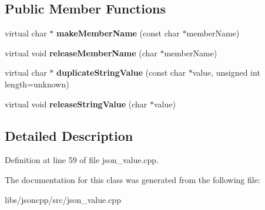 \subsection*{Public Member Functions}
\begin{DoxyCompactItemize}
\item 
\hypertarget{class_json_1_1_default_value_allocator_a83643548a23763cd9e8fcc9889ae3428}{virtual char $\ast$ {\bfseries make\-Member\-Name} (const char $\ast$member\-Name)}\label{class_json_1_1_default_value_allocator_a83643548a23763cd9e8fcc9889ae3428}

\item 
\hypertarget{class_json_1_1_default_value_allocator_a62df0985d957573f82be4f520bf00043}{virtual void {\bfseries release\-Member\-Name} (char $\ast$member\-Name)}\label{class_json_1_1_default_value_allocator_a62df0985d957573f82be4f520bf00043}

\item 
\hypertarget{class_json_1_1_default_value_allocator_adc2dc8da259fe1153594787cfcfc68d5}{virtual char $\ast$ {\bfseries duplicate\-String\-Value} (const char $\ast$value, unsigned int length=unknown)}\label{class_json_1_1_default_value_allocator_adc2dc8da259fe1153594787cfcfc68d5}

\item 
\hypertarget{class_json_1_1_default_value_allocator_a5e7f4fbebe7f9263090276e937a6a8d2}{virtual void {\bfseries release\-String\-Value} (char $\ast$value)}\label{class_json_1_1_default_value_allocator_a5e7f4fbebe7f9263090276e937a6a8d2}

\end{DoxyCompactItemize}


\subsection{Detailed Description}


Definition at line 59 of file json\-\_\-value.\-cpp.



The documentation for this class was generated from the following file\-:\begin{DoxyCompactItemize}
\item 
libs/jsoncpp/src/json\-\_\-value.\-cpp\end{DoxyCompactItemize}

